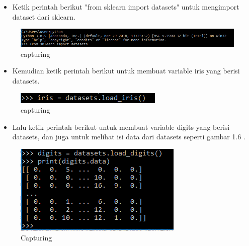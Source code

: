 \begin{enumerate}
\begin{itemize}
\item Ketik perintah berikut "from sklearn import datasets" untuk mengimport dataset dari sklearn.
\end{itemize}
\begin{figure}[ht]
\centering
\includegraphics[scale=0.5]{figures/4.png}
\caption{capturing}
\label{Import Datasets}
\end{figure}
\begin{itemize}
\item Kemudian ketik perintah berikut  untuk membuat variable iris yang berisi datasets.
\end{itemize}
\begin{figure}[ht]
\centering
\includegraphics[scale=0.9]{figures/5.png}
\caption{capturing}
\label{Variable Iris}
\end{figure}
\begin{itemize}
\item Lalu ketik perintah berikut untuk membuat variable digits yang berisi datasets, dan juga untuk melihat isi data dari datasets seperti gambar 1.6 .
\end{itemize}
\begin{figure}[ht]
\centering
\includegraphics[scale=0.9]{figures/8.png}
\caption{Capturing}
\label{Variable Digits}
\end{figure}



\end{enumerate}

